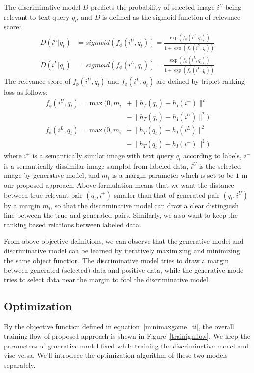 \documentclass[journal]{IEEEtran}
\begin{document}
The discriminative model $D$ predicts the probability of selected image $i^U$ being relevant to text query $q_t$, and $D$ is defined as the sigmoid function of relevance score:
\begin{equation}
\label{discrminativedef}
\begin{split}
D(i^U|q_t) &= sigmoid(f_\phi(i^U,q_t)) = \frac{\exp(f_\phi(i^U,q_t))}{1+\exp(f_\phi(i^U,q_t))}\\
D(i^L|q_t) &= sigmoid(f_\phi(i^L,q_t)) = \frac{\exp(f_\phi(i^L,q_t))}{1+\exp(f_\phi(i^L,q_t))}
\end{split}
\end{equation}
The relevance score of $f_\phi(i^U,q_t)$ and $f_\phi(i^L,q_t)$ are defined by triplet ranking loss as follows:
\begin{equation}
\label{triplet_u}
\begin{split}
f_\phi(i^U,q_t) = \max(0, m_i&+\|h_T(q_t)-h_I(i^+)\|^2\\
							  &-\|h_T(q_t)-h_I(i^U)\|^2)
\end{split}
\end{equation}
\begin{equation}
\label{triplet_l}
\begin{split}
f_\phi(i^L,q_t) = \max(0, m_i&+\|h_T(q_t)-h_I(i^L)\|^2\\
&-\|h_T(q_t)-h_I(i^-)\|^2)
\end{split}
\end{equation}
where $i^+$ is a semantically similar image with text query $q_t$ according to labels, $i^-$ is a semantically dissimilar image sampled from labeled data, $i^U$ is the selected image by generative model, and $m_i$ is a margin parameter which is set to be $1$ in our proposed approach. Above formulation means that we want the distance between true relevant pair $(q_t,i^+)$ smaller than that of generated pair $(q_t,i^U)$ by a margin $m_i$, so that the discriminative model can draw a clear distinguish line between the true and generated pairs. Similarly, we also want to keep the ranking based relations between labeled data.

From above objective definitions, we can observe that the generative model and discriminative model can be learned by iteratively maximizing and minimizing the same object function. The discriminative model tries to draw a margin between generated (selected) data and positive data, while the generative mode tries to select data near the margin to fool the discriminative model.
\subsection{Optimization}
By the objective function defined in equation~\ref{minimaxgame_ti}, the overall training flow of proposed approach is shown in Figure~\ref{trainignflow}. We keep the parameters of generative model fixed while training the discriminative model and vise versa. We'll introduce the optimization algorithm of these two models separately. 
\end{document}
